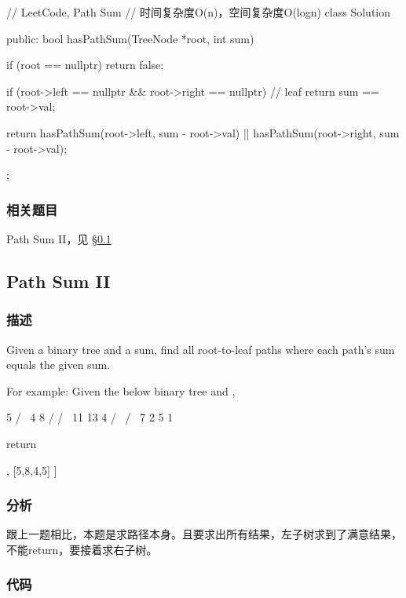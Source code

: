 \begin{Code}
// LeetCode, Path Sum
// 时间复杂度O(n)，空间复杂度O(logn)
class Solution {
public:
    bool hasPathSum(TreeNode *root, int sum) {
        if (root == nullptr) return false;

        if (root->left == nullptr && root->right == nullptr) // leaf
            return sum == root->val;

        return hasPathSum(root->left, sum - root->val)
                || hasPathSum(root->right, sum - root->val);
    }
};
\end{Code}


\subsubsection{相关题目}
\begindot
\item Path Sum II，见 \S \ref{sec:path-sum-ii}
\myenddot


\subsection{Path Sum II}
\label{sec:path-sum-ii}


\subsubsection{描述}
Given a binary tree and a sum, find all root-to-leaf paths where each path's sum equals the given sum.

For example:
Given the below binary tree and ,
\begin{Code}
          5
         / \
        4   8
       /   / \
      11  13  4
     /  \    / \
    7    2  5   1
\end{Code}
return
\begin{Code}
[
   [5,4,11,2],
   [5,8,4,5]
]
\end{Code}


\subsubsection{分析}
跟上一题相比，本题是求路径本身。且要求出所有结果，左子树求到了满意结果，不能return，要接着求右子树。

\subsubsection{代码}

